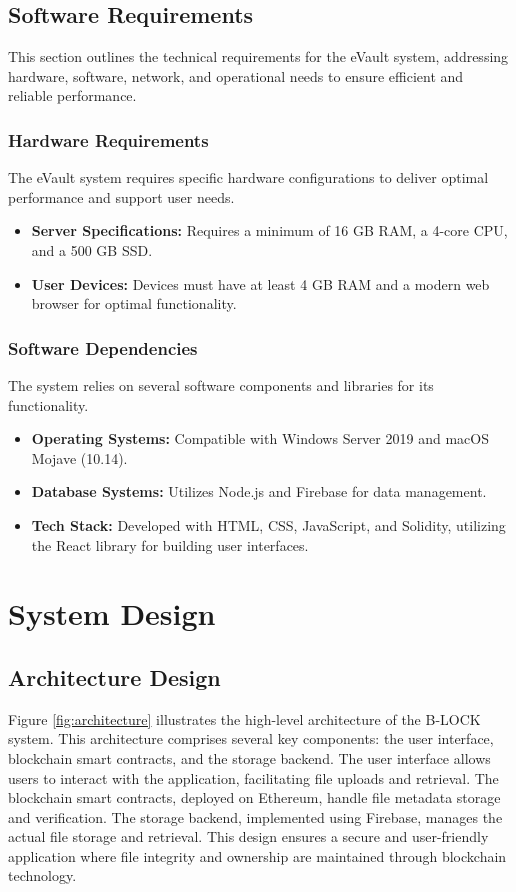 \documentclass[12pt,a4paper]{report}
\begin{document}
   \section{Software Requirements}

This section outlines the technical requirements for the eVault system, addressing hardware, software, network, and operational needs to ensure efficient and reliable performance.

\subsection{Hardware Requirements}
The eVault system requires specific hardware configurations to deliver optimal performance and support user needs.
\begin{itemize}
    \item \textbf{Server Specifications:} Requires a minimum of 16 GB RAM, a 4-core CPU, and a 500 GB SSD.
    \item \textbf{User Devices:} Devices must have at least 4 GB RAM and a modern web browser for optimal functionality.
\end{itemize}

\subsection{Software Dependencies}
The system relies on several software components and libraries for its functionality.
\begin{itemize}
    \item \textbf{Operating Systems:} Compatible with Windows Server 2019 and macOS Mojave (10.14).
    \item \textbf{Database Systems:} Utilizes Node.js and Firebase for data management.
    \item \textbf{Tech Stack:} Developed with HTML, CSS, JavaScript, and Solidity, utilizing the React library for building user interfaces.
\end{itemize}



\chapter{System Design}
\section{Architecture Design}
Figure \ref{fig:architecture} illustrates the high-level architecture of the B-LOCK system. This architecture comprises several key components: the user interface, blockchain smart contracts, and the storage backend. The user interface allows users to interact with the application, facilitating file uploads and retrieval. The blockchain smart contracts, deployed on Ethereum, handle file metadata storage and verification. The storage backend, implemented using Firebase, manages the actual file storage and retrieval. This design ensures a secure and user-friendly application where file integrity and ownership are maintained through blockchain technology.
\end{document}
